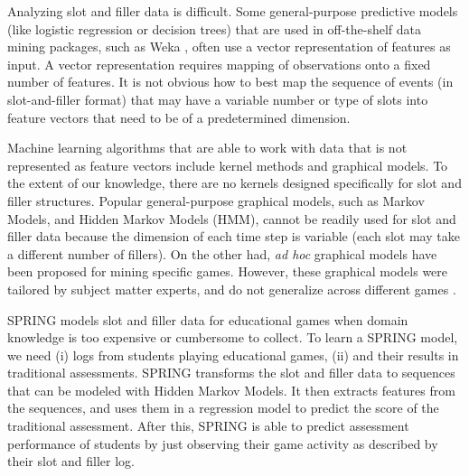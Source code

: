 \documentclass{sigchi}
\def\algname{SPRING\xspace}
\begin{document}
	
	Analyzing slot and filler data is difficult.
	Some general-purpose predictive models (like logistic regression or decision trees)  that are used in off-the-shelf data mining packages, such as Weka \cite{hall2009weka}, often use a vector representation of features as input. 
	A vector representation requires mapping of observations onto a fixed number of features.
	It is not obvious how to best map the sequence of events (in slot-and-filler format) that may have a variable number or type of slots into feature vectors  that need to be of a predetermined dimension.
	
	Machine learning algorithms that are able to work with data that is not represented as feature vectors include kernel methods and graphical models.
	To the extent of our knowledge, there are no kernels designed specifically for slot and filler structures.
	Popular general-purpose graphical models, such as Markov Models, and Hidden Markov Models (HMM), cannot be readily used for slot and filler data because the dimension of each time step is variable (each slot may take a different number of fillers).
	On the other had,  \textit{ad hoc} graphical models have  been proposed for mining specific games.
	However, these graphical models were tailored by subject matter experts, and do not generalize across different games \cite{rowe2010integrating}.
	
	\algname models slot and filler data for educational games when domain knowledge is too expensive or cumbersome to collect.
	To learn a \algname model, we need (i) logs  from students playing educational games, (ii) and  their results in  traditional assessments.
	\algname transforms the slot and filler data to sequences that can be modeled with Hidden Markov Models.
	It then extracts features from the sequences, and uses them in a regression model to predict the score of the traditional assessment.
	After this, \algname is able to predict assessment performance of students by just observing their game activity as described by their slot and filler log.
	
\end{document}

